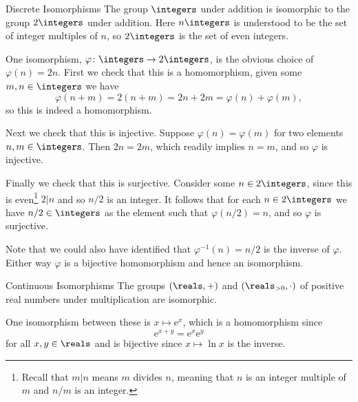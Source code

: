 \documentclass[fleqn]{NotesClass}
\newcommand*{\e}{\mathrm{e}}
\begin{document}
    \begin{exm}{Discrete Isomorphisms}{}
        The group \(\integers\) under addition is isomorphic to the group \(2\integers\) under addition.
        Here \(n\integers\) is understood to be the set of integer multiples of \(n\), so \(2\integers\) is the set of even integers.
        
        One isomorphism, \(\varphi\colon \integers \to 2\integers\), is the obvious choice of \(\varphi(n) = 2n\).
        First we check that this is a homomorphism, given some \(m, n \in \integers\) we have
        \begin{equation}
            \varphi(n + m) = 2(n + m) = 2n + 2m = \varphi(n) + \varphi(m),
        \end{equation}
        so this is indeed a homomorphism.
        
        Next we check that this is injective.
        Suppose \(\varphi(n) = \varphi(m)\) for two elements \(n, m \in \integers\).
        Then \(2n = 2m\), which readily implies \(n = m\), and so \(\varphi\) is injective.
        
        Finally we check that this is surjective.
        Consider some \(n \in 2\integers\), since this is even\footnote{Recall that \(m|n\) means \(m\) divides \(n\), meaning that \(n\) is an integer multiple of \(m\) and \(n/m\) is an integer.} \(2|n\) and so \(n/2\) is an integer.
        It follows that for each \(n \in 2\integers\) we have \(n/2 \in \integers\) as the element such that \(\varphi(n/2) = n\), and so \(\varphi\) is surjective.
        
        Note that we could also have identified that \(\varphi^{-1}(n) = n/2\) is the inverse of \(\varphi\).
        Either way \(\varphi\) is a bijective homomorphism and hence an isomorphism.
    \end{exm}
    
    \begin{exm}{Continuous Isomorphisms}{}
        The groups \((\reals, +)\) and \((\reals_{>0}, \cdot)\) of positive real numbers under multiplication are isomorphic.
        
        One isomorphism between these is \(x \mapsto \e^{x}\), which is a homomorphism since
        \begin{equation}
            \e^{x + y} = \e^x\e^y
        \end{equation}
        for all \(x, y \in \reals\) and is bijective since \(x \mapsto \ln x\) is the inverse.
    \end{exm}
\end{document}
